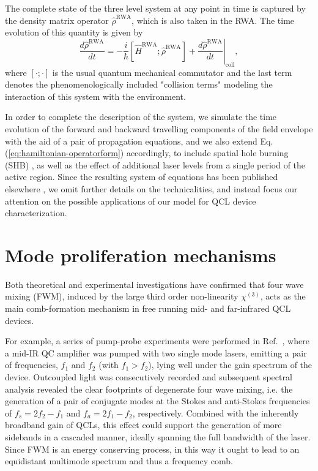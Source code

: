 \documentclass[journal]{IEEEtran}
\def\h{\hat}
\begin{document}
The complete state of the three level system at any point in time is captured by the density matrix operator $\h{\rho}^{\text{RWA}}$, which is also taken in the RWA. The time evolution of this quantity is given by
	\begin{equation}
	\label{eq:vonNeumann}
	\frac{d \h{\rho}^{\text{RWA}}}{dt} = -\frac{i}{\hbar}[\h{H}^{\text{RWA}};\h{\rho}^{\text{RWA}}] + \left.\frac{d\h{\rho}^{\text{RWA}}}{dt}\right|_{\text{coll}},
	\end{equation}
	where $[\cdot;\cdot]$ is the usual quantum mechanical commutator and the last term denotes the phenomenologically included "collision terms" modeling the interaction of this system with the environment.


	In order to complete the description of the system, we simulate the time evolution of the forward and backward travelling components of the field envelope with the aid of a pair of propagation equations, and we also extend Eq. (\ref{eq:hamiltonian-operatorform}) accordingly,  to include  spatial hole burning (SHB) \cite{gordon2008multimode}, as well as the effect of additional laser levels from a single period of the active region. Since the resulting system of equations has been published elsewhere \cite{petz2016}, we omit further details on the technicalities, and instead focus our attention on the possible applications of our model for QCL device characterization. 
	
	\section{Mode proliferation mechanisms}
	\label{sec:proliferation}
	
	Both theoretical \cite{khurgin2014coherent} and experimental \cite{friedli2013four} investigations have confirmed that four wave mixing (FWM), induced by the large third order non-linearity $\chi^{(3)}$, acts as the main comb-formation mechanism in free running mid- and far-infrared QCL devices.
	
	For example, a series of pump-probe experiments were performed in Ref.~\cite{friedli2013four}, where a mid-IR QC amplifier was pumped with two single mode lasers, emitting a pair of frequencies, $f_1$ and $f_2$ (with $f_1 > f_2$), lying well under the gain spectrum of the device. Outcoupled light was consecutively recorded and subsequent spectral analysis revealed the clear footprints of degenerate four wave mixing, i.e. the generation of a pair of conjugate modes at the Stokes and anti-Stokes frequencies of  $f_s = 2f_2 -f_1 $ and $f_a = 2f_1 - f_2 $, respectively. Combined with the inherently broadband gain of QCLs, this effect could support the generation of more sidebands in a cascaded manner, ideally spanning the full bandwidth of the laser. Since FWM is an energy conserving process, in this way it ought to lead to an equidistant multimode spectrum and thus a frequency comb.
	
\end{document}
